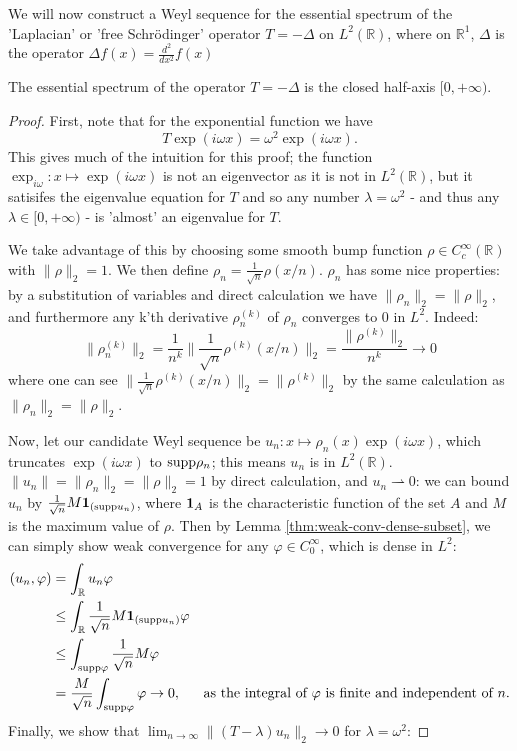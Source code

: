 \documentclass[../main.tex]{subfiles}
\begin{document}
We will now construct a Weyl sequence for the essential spectrum of the 'Laplacian' or 'free Schr\"odinger' operator $T = -\Delta$ on $L^2(\mathbb{R})$,
where on $\mathbb{R}^1$, $\Delta$ is the operator $\Delta f (x) = \frac{d^2}{dx^2} f(x)$

\begin{example}
The essential spectrum of the operator $T = -\Delta$ is the closed half-axis $[0, +\infty)$.
\end{example}
\begin{proof}
First, note that for the exponential function we have 
\begin{equation}\label{eqn:laplace-eigenvector}
T\exp(i\omega x) = \omega^2 \exp(i\omega x).
\end{equation}
This gives much of the intuition for this proof; the function $\exp_{i \omega}: x \mapsto \exp(i\omega x)$ is not an eigenvector 
as it is not in $L^2(\mathbb{R})$, but it satisifes the eigenvalue equation for $T$ and so any number $\lambda = \omega^2$ -
and thus any $\lambda \in [0, +\infty)$ - is 'almost' an eigenvalue for $T$.

We take advantage of this by choosing some smooth bump function $\rho \in C^\infty_c(\mathbb{R})$ with $\|\rho\|_2 = 1$. We
then define $\rho_n = \frac{1}{\sqrt{n}}\rho(x/n)$. $\rho_n$ has some nice properties: by a substitution of variables and direct calculation we have $\|\rho_n\|_2 = \|\rho\|_2$, and furthermore any k'th derivative $\rho_n^{(k)}$ of $\rho_n$ 
converges to 0 in $L^2$. Indeed:
\begin{equation}\label{eqn:rhokn-vanishes}
\|\rho_n^{(k)}\|_2 = \frac{1}{n^k}\|\frac{1}{\sqrt{n}}\rho^{(k)}(x/n)\|_2 = \frac{\|\rho^{(k)}\|_2}{n^k} \rightarrow 0
\end{equation}
where one can see $\|\frac{1}{\sqrt{n}}\rho^{(k)}(x/n)\|_2 = \|\rho^{(k)}\|_2$ by the same calculation as  $\|\rho_n\|_2 = \|\rho\|_2$.

Now, let our candidate Weyl sequence be $u_n: x \mapsto \rho_n(x)\exp(i\omega x)$,
which truncates $\exp(i\omega x)$ to $\mathrm{supp} \rho_n$; this means $u_n$ is in $L^2(\mathbb{R})$.
$\|u_n\| = \|\rho_n\|_2 = \|\rho\|_2 = 1$ by direct calculation, and $u_n \rightharpoonup 0$: we can bound $u_n$ by $\frac{1}{\sqrt{n}} M \mathbf{1}_{(\mathrm{supp} u_n)}$, where $\mathbf{1}_A$ is the characteristic function of the set $A$ and $M$ is the maximum value of $\rho$. Then by Lemma \ref{thm:weak-conv-dense-subset}, we can simply show weak convergence for any $\varphi \in C_0^\infty$, which is dense in $L^2$:
\begin{align*}
( u_n, \varphi ) & = \int_{\mathbb{R}}u_n \varphi & \\
& \leq \int_{\mathbb{R}} \frac{1}{\sqrt{n}} M \mathbf{1}_{(\mathrm{supp} u_n)} \varphi & \\
& \leq \int_{\mathrm{supp} \varphi} \frac{1}{\sqrt{n}} M  \varphi & \\
& = \frac{M}{\sqrt{n}} \int_{\mathrm{supp} \varphi} \varphi \rightarrow 0, & \text{as the integral of $\varphi$ is finite and independent of $n$.}
\end{align*}
Finally, we show that $\lim_{n \rightarrow \infty}\|(T - \lambda)u_n\|_2  \rightarrow 0$ for $\lambda = \omega^2$:


\end{proof}
\end{document}
